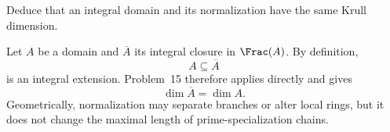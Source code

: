 \begin{problem}\label{prob:vi29-16}
Deduce that an integral domain and its normalization have the same Krull dimension.

\end{problem}

\ifdefined\FullProblemDossiers
\begin{solution}
Let \(A\) be a domain and \(\overline A\) its integral closure in \(\Frac(A)\).  By definition,
\[
A\subseteq\overline A
\]
is an integral extension.  Problem~15 therefore applies directly and gives
\[
\boxed{\dim\overline A=\dim A}.
\]
Geometrically, normalization may separate branches or alter local rings, but it does not change the maximal
length of prime-specialization chains.
\end{solution}
\fi
